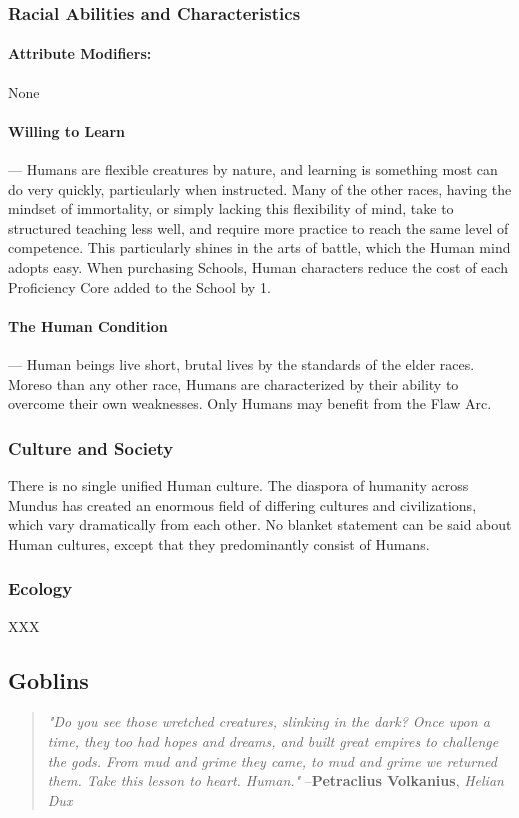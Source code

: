 \documentclass[oneside,11pt,english]{book}
\begin{document}
\subsubsection*{Racial Abilities and Characteristics} 
\paragraph{Attribute Modifiers:} None
\paragraph{\label{par:Willing to Learn}Willing to Learn}---\quad
Humans are flexible creatures by nature, and learning is something most can do
very quickly, particularly when instructed. Many of the other races, having the
mindset of immortality, or simply lacking this flexibility of mind, take to
structured teaching less well, and require more practice to reach the same level
of competence. This particularly shines in the arts of battle, which the Human
mind adopts easy. When purchasing Schools, Human characters reduce the cost of
each Proficiency Core added to the School by 1.

\paragraph{\label{par:The Human Condition}The Human Condition}---\quad
Human beings live short, brutal lives by the standards of the elder races.
Moreso than any other race, Humans are characterized by their ability to
overcome their own weaknesses. Only Humans may benefit from the Flaw Arc.
\subsubsection*{Culture and Society} 
There is no single unified Human culture. The diaspora of humanity across Mundus
has created an enormous field of differing cultures and civilizations, which
vary dramatically from each other. No blanket statement can be said about Human
cultures, except that they predominantly consist of Humans.
\subsubsection*{Ecology} 
XXX 
\subsection{Goblins}\label{sec:goblins}

\begin{quote}
  \emph{"Do you see those wretched creatures, slinking in the dark? Once upon a
    time, they too had hopes and dreams, and built great empires to challenge
    the gods. From mud and grime they came, to mud and grime we returned them.
    Take this lesson to heart. Human."}
  \hfill --\textbf{Petraclius Volkanius}, \textit{Helian Dux}
\end{quote}
\end{document}
